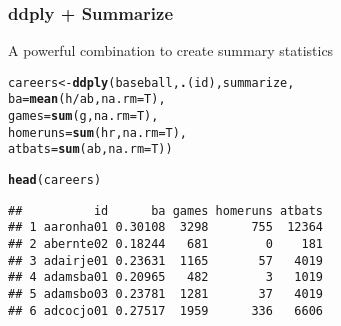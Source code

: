 \documentclass{beamer}\usepackage[]{graphicx}\usepackage[]{color}
\makeatletter
\newcommand{\hlopt}[1]{\textcolor[rgb]{0,0,0}{#1}}%
\newcommand{\hlstd}[1]{\textcolor[rgb]{0.345,0.345,0.345}{#1}}%
\newcommand{\hlkwb}[1]{\textcolor[rgb]{0.69,0.353,0.396}{#1}}%
\newcommand{\hlkwc}[1]{\textcolor[rgb]{0.333,0.667,0.333}{#1}}%
\newcommand{\hlkwd}[1]{\textcolor[rgb]{0.737,0.353,0.396}{\textbf{#1}}}%
\newenvironment{kframe}{%
 \def\at@end@of@kframe{}%
 \ifinner\ifhmode%
  \def\at@end@of@kframe{\end{minipage}}%
  \begin{minipage}{\columnwidth}%
 \fi\fi%
 \def\FrameCommand##1{\hskip\@totalleftmargin \hskip-\fboxsep
 \colorbox{shadecolor}{##1}\hskip-\fboxsep
     \hskip-\linewidth \hskip-\@totalleftmargin \hskip\columnwidth}%
 \MakeFramed {\advance\hsize-\width
   \@totalleftmargin\z@ \linewidth\hsize
   \@setminipage}}%
 {\par\unskip\endMakeFramed%
 \at@end@of@kframe}
\newenvironment{knitrout}{}{} %
\makeatother
\begin{document}
\begin{frame}[fragile]
\frametitle{ddply + Summarize}
{\large A powerful combination to create summary statistics}
\begin{knitrout}\scriptsize
{}\color{fgcolor}\begin{kframe}
\begin{alltt}
\hlstd{careers} \hlkwb{<-} \hlkwd{ddply}\hlstd{(baseball,} \hlkwd{.}\hlstd{(id), summarize,}
                 \hlkwc{ba} \hlstd{=} \hlkwd{mean}\hlstd{(h}\hlopt{/}\hlstd{ab,} \hlkwc{na.rm}\hlstd{=T),}
                 \hlkwc{games} \hlstd{=} \hlkwd{sum}\hlstd{(g,} \hlkwc{na.rm}\hlstd{=T),}
                 \hlkwc{homeruns} \hlstd{=} \hlkwd{sum}\hlstd{(hr,} \hlkwc{na.rm}\hlstd{=T),}
                 \hlkwc{atbats} \hlstd{=} \hlkwd{sum}\hlstd{(ab,} \hlkwc{na.rm}\hlstd{=T))}

\hlkwd{head}\hlstd{(careers)}
\end{alltt}
\begin{verbatim}
##          id      ba games homeruns atbats
## 1 aaronha01 0.30108  3298      755  12364
## 2 abernte02 0.18244   681        0    181
## 3 adairje01 0.23631  1165       57   4019
## 4 adamsba01 0.20965   482        3   1019
## 5 adamsbo03 0.23781  1281       37   4019
## 6 adcocjo01 0.27517  1959      336   6606
\end{verbatim}
\end{kframe}
\end{knitrout}
\end{frame}
\end{document}
